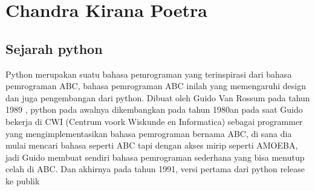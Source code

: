 
\section{Chandra Kirana Poetra}



 
 
\subsection{Sejarah python}

\begin{flushleft}
\qquad Python merupakan suatu bahasa pemrograman yang terinspirasi dari bahasa pemrograman ABC, bahasa pemrograman ABC inilah yang memengaruhi design dan juga pengembangan dari python. Dibuat oleh Guido Van Rossum pada tahun 1989 , python pada awalnya dikembangkan pada tahun 1980an pada saat Guido bekerja di CWI (Centrum voork Wiskunde en Informatica) sebagai programmer yang mengimplementasikan bahasa pemrograman bernama ABC, di sana dia mulai mencari bahasa seperti ABC tapi dengan akses mirip seperti AMOEBA, jadi Guido membuat sendiri bahasa pemrograman sederhana yang bisa menutup celah di ABC. Dan akhirnya pada tahun 1991, versi pertama dari python release ke publik
\end{flushleft}

